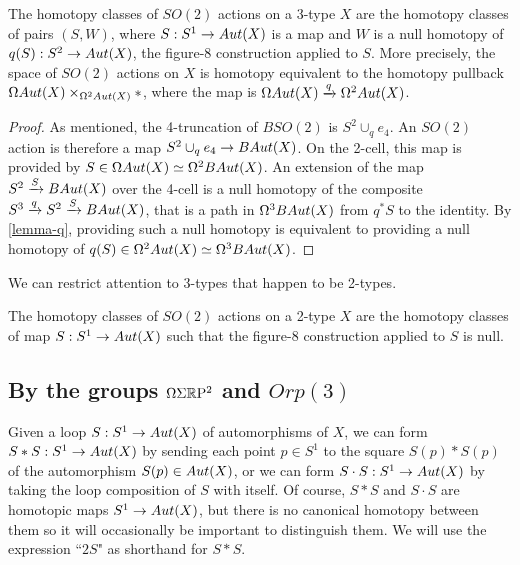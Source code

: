 \documentclass{amsart}
\begin{document}
\begin{prop}[Actions by $SO(2)$] 
\label{prop-so2action}
The homotopy classes of $SO(2)$ actions on a 3-type $X$ are the homotopy classes of pairs $(S,W)$, where $S: S^1 \rightarrow Aut(X)$ is a map and $W$ is a null homotopy of $q(S): S^2 \rightarrow Aut(X)$, the figure-8 construction applied to $S$.  More precisely, the space of $SO(2)$ actions on $X$ is homotopy equivalent to the homotopy pullback $\Omega Aut(X) \times_{\Omega^2 Aut(X)} \ast$, where the map is $\Omega Aut(X) \xrightarrow{q} \Omega^2 Aut(X)$.
\end{prop}
\begin{proof}
As mentioned, the 4-truncation of $BSO(2)$ is $S^2 \cup_q e_4$.  An $SO(2)$ action is therefore a map $S^2 \cup_q e_4 \rightarrow BAut(X)$.  On the 2-cell, this map is provided by $S \in \Omega Aut(X) \simeq \Omega^2 BAut(X)$.  An extension of the map $S^2 \xrightarrow{S} BAut(X)$ over the 4-cell is a null homotopy of the composite $S^3 \xrightarrow{q} S^2 \xrightarrow{S} BAut(X)$, that is a path in $\Omega^3 BAut(X)$ from $q^\ast S$ to the identity.  By \cref{lemma-q}, providing such a null homotopy is equivalent to providing a null homotopy of $q(S) \in \Omega^2Aut(X) \simeq \Omega^3 BAut(X)$.
\end{proof}

We can restrict attention to 3-types that happen to be 2-types.
\begin{corollary}
The homotopy classes of $SO(2)$ actions on a 2-type $X$ are the homotopy classes of map $S: S^1 \rightarrow Aut(X)$ such that the figure-8 construction applied to $S$ is null.
\end{corollary}

\subsection{By the groups $\Omega \Sigma \mathbb R \mathrm{P}^2$ and $Orp(3)$}

Given a loop $S: S^1 \rightarrow Aut(X)$ of automorphisms of $X$, we can form $S \ast S : S^1 \rightarrow Aut(X)$ by sending each point $p \in S^1$ to the square $S(p) \ast S(p)$ of the automorphism $S(p) \in Aut(X)$, or we can form $S \cdot S : S^1 \rightarrow Aut(X)$ by taking the loop composition of $S$ with itself.  Of course, $S \ast S$ and $S \cdot S$ are homotopic maps $S^1 \rightarrow Aut(X)$, but there is no canonical homotopy between them so it will occasionally be important to distinguish them.  We will use the expression ``$2S$" as shorthand for $S \ast S$.
\end{document}
